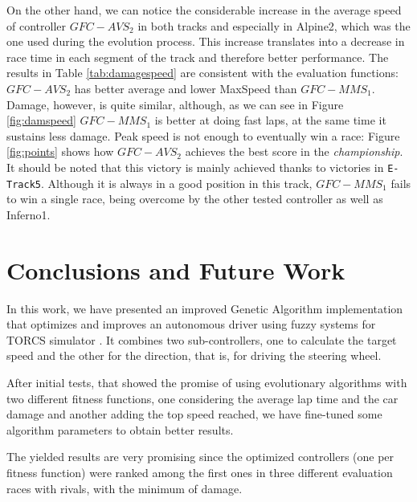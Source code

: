 \documentclass[conference]{IEEEtran}
\begin{document}
On the other hand, we can notice the considerable increase in the
average speed of controller $GFC-AVS_2$ in both tracks and especially
in Alpine2, which was the one used during the evolution process. This
increase translates into a decrease in race time in each segment of
the track and therefore better performance. The results in Table
\ref{tab:damagespeed} are consistent with the evaluation functions:
$GFC-AVS_2$ has better average and lower MaxSpeed than
$GFC-MMS_1$. Damage, however, is quite similar, although, as we can
see in Figure \ref{fig:damspeed} $GFC-MMS_1$ is better at doing fast
laps, at the same time it sustains less damage. Peak speed is not
enough to eventually win a race: Figure \ref{fig:points} shows how
$GFC-AVS_2$ achieves the best score in the {\em championship}. It
should be noted that this victory is mainly achieved thanks to
victories in {\tt E-Track5}. Although it is always in a good position
in this track, $GFC-MMS_1$ fails to win a single race, being overcome
by the other tested controller as well as Inferno1.








\section{Conclusions and Future Work} 
\label{sec:conclusions}

In this work, we have presented an improved Genetic Algorithm implementation that optimizes and improves an autonomous driver using fuzzy systems for TORCS simulator \cite{evo17}. It combines two sub-controllers, one to calculate the target speed and the other for the direction, that is, for driving the steering wheel.

After initial tests, that showed the promise of using evolutionary algorithms with two different fitness functions, one considering the average lap time and the car damage and another adding the top speed reached, we have fine-tuned some algorithm parameters to obtain better results. %

The yielded results are very promising since the optimized controllers (one per fitness function) were ranked among the first ones in three different evaluation races with rivals, with the minimum of damage.
\end{document}
